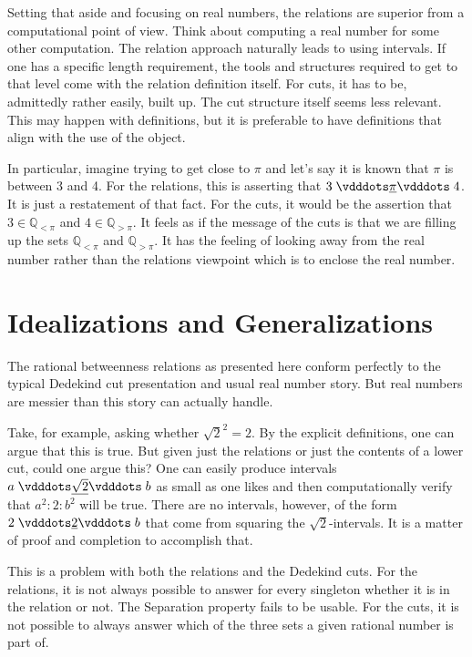 \documentclass[12pt]{article}
\newcommand{\qcut}[2][x]{\ensuremath{\mathbb{Q}_{#2 #1}}}
\newcommand{\qlt}[1][x]{\qcut[#1]{<}}
\newcommand{\qgt}[1][x]{\qcut[#1]{>}}
\begin{document}
Setting that aside and focusing on real numbers, the relations are superior from a computational point of view. Think about computing a real number for some other computation. The relation approach naturally leads to using intervals. If one has a specific length requirement, the tools and structures required to get to that level come with the relation definition itself. For cuts, it has to be, admittedly rather easily, built up. The cut structure itself seems less relevant. This may happen with definitions, but it is preferable to have definitions that align with the use of the object. 

In particular, imagine trying to get close to $\pi$ and let's say it is known that $\pi$ is between 3 and 4. For the relations, this is asserting that $3 \xrel[\pi] 4$. It is just a restatement of that fact. For the cuts, it would be the assertion that $3 \in \qlt[\pi]$ and $4 \in \qgt[\pi]$. It feels as if the message of the cuts is that we are filling up the sets $\qlt[\pi]$ and $\qgt[\pi]$. It has the feeling of looking away from the real number rather than the relations viewpoint which is to enclose the real number. 


\section{Idealizations and Generalizations}

The rational betweenness relations as presented here conform perfectly to the typical Dedekind cut presentation and usual real number story. But real numbers are messier than this story can actually handle. 

Take, for example, asking whether $\sqrt{2}^2 = 2$. By the explicit definitions, one can argue that this is true. But given just the relations or just the contents of a lower cut, could one argue this? One can easily produce intervals $a \xrel[\sqrt{2}] b$ as small as one likes and then computationally verify that $a^2 : 2 :b^2$ will be true. There are no intervals, however, of the form $2 \xrel[2] b$ that come from squaring the $\sqrt{2}$-intervals. It is a matter of proof and completion to accomplish that. 

This is a problem with both the relations and the Dedekind cuts. For the relations, it is not always possible to answer for every singleton whether it is in the relation or not. The Separation property fails to be usable. For the cuts, it is not possible to always answer which of the three sets a given rational number is part of. 
\end{document}
